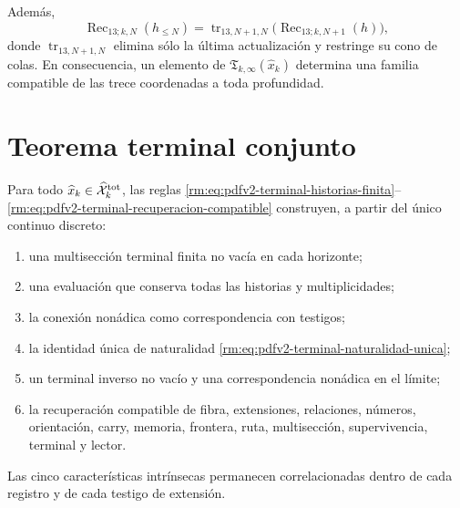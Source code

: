 Adem\'as,
\begin{equation}
\label{rm:eq:pdfv2-terminal-recuperacion-compatible}
 \operatorname{Rec}_{13;k,N}(h_{\leq N})
 =\operatorname{tr}_{13,N+1,N}
   \bigl(\operatorname{Rec}_{13;k,N+1}(h)\bigr),
\end{equation}
donde \(\operatorname{tr}_{13,N+1,N}\) elimina s\'olo la \'ultima
actualizaci\'on y restringe su cono de colas. En consecuencia, un elemento
de \(\mathfrak T_{k,\infty}(\widehat x_k)\) determina una familia compatible de las
trece coordenadas a toda profundidad.

\section{Teorema terminal conjunto}

\begin{theorem}
\label{rm:thm:pdfv2-terminal-conjunto}
Para todo \(\widehat x_k\in\widehat{\mathcal X}^{\rm tot}_k\), las reglas
\eqref{rm:eq:pdfv2-terminal-historias-finita}--
\eqref{rm:eq:pdfv2-terminal-recuperacion-compatible} construyen, a partir del
\'unico continuo discreto:
\begin{enumerate}
 \item una multisecci\'on terminal finita no vac\'ia en cada horizonte;
 \item una evaluaci\'on que conserva todas las historias y multiplicidades;
 \item la conexi\'on non\'adica como correspondencia con testigos;
 \item la identidad \'unica de naturalidad
       \eqref{rm:eq:pdfv2-terminal-naturalidad-unica};
 \item un terminal inverso no vac\'io y una correspondencia non\'adica en el
       l\'imite;
 \item la recuperaci\'on compatible de fibra, extensiones, relaciones,
       n\'umeros, orientaci\'on, carry, memoria, frontera, ruta,
       multisecci\'on, supervivencia, terminal y lector.
\end{enumerate}
Las cinco caracter\'isticas intr\'insecas permanecen correlacionadas dentro
de cada registro y de cada testigo de extensi\'on.
\end{theorem}

